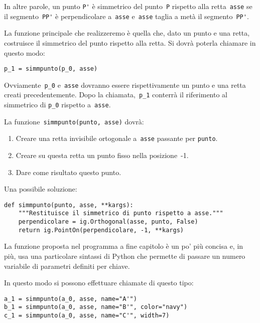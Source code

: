 In altre parole,
un punto \lstinline{P'} è simmetrico del punto~\lstinline{P} rispetto alla 
retta~\lstinline{asse} 
se il
segmento~\lstinline{PP'} è perpendicolare a~\lstinline{asse} e~\lstinline{asse} 
taglia a metà il segmento~\lstinline{PP'}.

La funzione principale che realizzeremo è quella che, dato un punto e una
retta, costruisce il simmetrico del punto rispetto alla retta.
Si dovrà poterla chiamare in questo modo:

\begin{lstlisting}
p_1 = simmpunto(p_0, asse)
\end{lstlisting}

Ovviamente~\lstinline{p_0} e~\lstinline{asse} dovranno essere rispettivamente 
un punto e una retta creati precedentemente.
Dopo la chiamata,~\lstinline{p_1} conterrà il riferimento al simmetrico di 
\lstinline{p_0} rispetto a~\lstinline{asse}.

La funzione~\lstinline{simmpunto(punto, asse)} dovrà:

\begin{enumerate} [noitemsep]
\item Creare una retta invisibile ortogonale a~\lstinline{asse} passante per 
\lstinline{punto}.
\item Creare su questa retta un punto fisso nella posizione~-1.
\item Dare come risultato questo punto.
\end{enumerate}

Una possibile soluzione:

\begin{lstlisting}
def simmpunto(punto, asse, **kargs):
    """Restituisce il simmetrico di punto rispetto a asse."""
    perpendicolare = ig.Orthogonal(asse, punto, False)
    return ig.PointOn(perpendicolare, -1, **kargs)
\end{lstlisting}

La funzione proposta nel programma a fine capitolo è un po' più concisa e,
in più, usa una particolare sintassi di Python che permette di passare un
numero variabile di parametri definiti per chiave.

In questo modo si possono effettuare chiamate di questo tipo:

\begin{lstlisting}
a_1 = simmpunto(a_0, asse, name="A'")
b_1 = simmpunto(a_0, asse, name="B'", color="navy")
c_1 = simmpunto(a_0, asse, name="C'", width=7)
\end{lstlisting}

